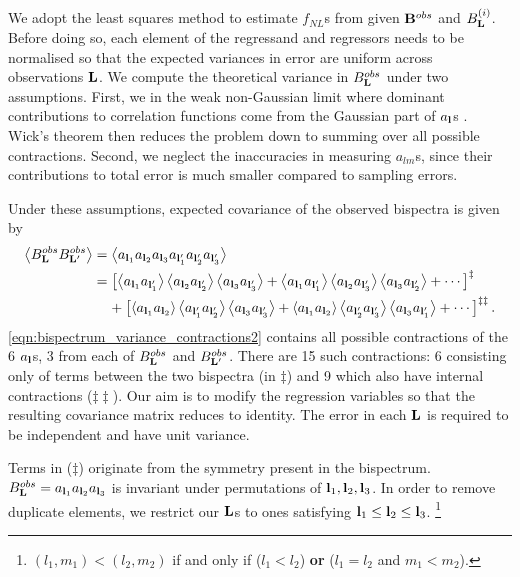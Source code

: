 We adopt the least squares method to estimate $f_{NL}$s from given $\mathbf{B}^{obs}$ and $B^{(i)}_\mathbf{L}$. Before doing so, each element of the regressand and regressors needs to be normalised so that the expected variances in error are uniform across observations $\mathbf{L}$. We compute the theoretical variance in $B^{obs}_\mathbf{L}$ under two assumptions. First, we in the weak non-Gaussian limit where dominant contributions to correlation functions come from the Gaussian part of $a_\mathbf{l}$s . Wick's theorem then reduces the problem down to summing over all possible contractions. Second, we neglect the inaccuracies in measuring $a_{lm}$s, since their contributions to total error is much smaller compared to sampling errors.

Under these assumptions, expected covariance of the observed bispectra is given by
\begin{align}
	\left< B^{obs}_\mathbf{L} B^{obs}_{\mathbf{L}'} \right> &= \left< a_{\mathbf{l}_1} a_{\mathbf{l}_2} a_{\mathbf{l}_3} a_{\mathbf{l}'_1} a_{\mathbf{l}'_2} a_{\mathbf{l}'_3} \right> 
	\label{eqn:bispectrum_variance_contractions1} \\
	&= \left[ \left< a_{\mathbf{l}_1} a_{\mathbf{l}'_1} \right> \left< a_{\mathbf{l}_2} a_{\mathbf{l}'_2} \right> \left< a_{\mathbf{l}_3} a_{\mathbf{l}'_3} \right> + \left< a_{\mathbf{l}_1} a_{\mathbf{l}'_1} \right> \left< a_{\mathbf{l}_2} a_{\mathbf{l}'_3} \right> \left< a_{\mathbf{l}_3} a_{\mathbf{l}'_2} \right> + \cdots \right]^\ddagger \nonumber \\
	&\;\;\;\; + \left[ \left< a_{\mathbf{l}_1} a_{\mathbf{l}_2} \right> \left< a_{\mathbf{l}'_1} a_{\mathbf{l}'_2} \right> \left< a_{\mathbf{l}_3} a_{\mathbf{l}'_3} \right> + \left< a_{\mathbf{l}_1} a_{\mathbf{l}_2} \right> \left< a_{\mathbf{l}'_2} a_{\mathbf{l}'_3} \right> \left< a_{\mathbf{l}_3} a_{\mathbf{l}'_1} \right> + \cdots \right]^{\ddagger\ddagger} \label{eqn:bispectrum_variance_contractions2}.
\end{align}
\eqref{eqn:bispectrum_variance_contractions2} contains all possible contractions of the 6 $a_\mathbf{l}$s, 3 from each of $B^{obs}_\mathbf{L}$ and $B^{obs}_{\mathbf{L}'}$. There are 15 such contractions: 6 consisting only of terms between the two bispectra (in $\ddagger$) and 9 which also have internal contractions ($\ddagger\ddagger$). Our aim is to modify the regression variables so that the resulting covariance matrix reduces to identity. The error in each $\mathbf{L}$ is required to be independent and have unit variance.

Terms in ($\ddagger$) originate from the symmetry present in the bispectrum. $B^{obs}_\mathbf{L} = a_{\mathbf{l}_1}  a_{\mathbf{l}_2}  a_{\mathbf{l}_3}$ is invariant under permutations of ${\mathbf{l}_1, \mathbf{l}_2, \mathbf{l}_3}$. In order to remove duplicate elements, we restrict our $\mathbf{L}$s to ones satisfying $\mathbf{l}_1 \le \mathbf{l}_2 \le \mathbf{l}_3$. \footnote{$(l_1,m_1) < (l_2,m_2)$ if and only if ($l_1 < l_2$) \textbf{or} ($l_1 = l_2$ and $m_1 < m_2$).}

